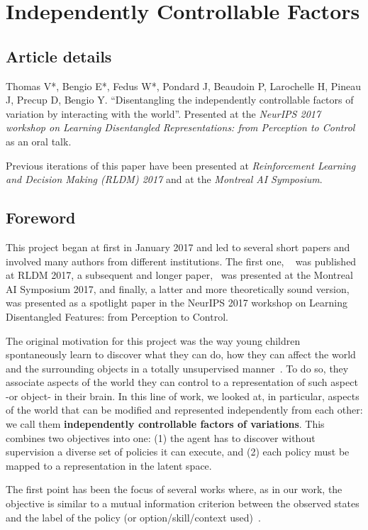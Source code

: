\chapter{Independently Controllable Factors}
\label{chapter:icf}
\section*{Article details}
Thomas V*, Bengio E*, Fedus W*, Pondard J, Beaudoin P, Larochelle H, Pineau J, Precup D, Bengio Y. ``Disentangling the independently controllable factors of variation by interacting with the world''. Presented at the \emph{ NeurIPS 2017 workshop on Learning Disentangled Representations: from Perception to Control} as an oral talk. 

Previous iterations of this paper have been presented at \emph{Reinforcement Learning and Decision Making (RLDM) 2017} and at the \emph{Montreal AI Symposium}.

\section*{Foreword}
This project began at first in January 2017 and led to several short papers and involved many authors from different institutions. The first one, ~\citet{bengio2017independently} was published at RLDM 2017, a subsequent and longer paper,~\citet{thomas2017independently} was presented at the Montreal AI Symposium 2017, and finally, a latter and more theoretically sound version, \citet{thomas2018disentangling} was presented as a spotlight paper in the NeurIPS 2017 workshop on Learning Disentangled Features: from Perception to Control.

The original motivation for this project was the way young children spontaneously learn to discover what they can do, how they can affect the world and the surrounding objects in a totally unsupervised manner~\citep{berlyne1966curiosity, gopnik1999scientist}. To do so, they associate aspects of the world they can control to a representation of such aspect -or object- in their brain. In this line of work, we looked at, in particular, aspects of the world that can be modified and represented independently from each other: we call them \textbf{independently controllable factors of variations}. This combines two objectives into one: (1) the agent has to discover without supervision a diverse set of policies it can execute, and (2) each policy must be mapped to a representation in the latent space.

The first point has been the focus of several works where, as in our work, the objective is similar to a mutual information criterion between the observed states and the label of the policy (or option/skill/context used)~\citep{still2012information, mohamed2015variational, gregor2016variational, florensa2017stochastic, eysenbach2018diversity, achiam2018variational}.

